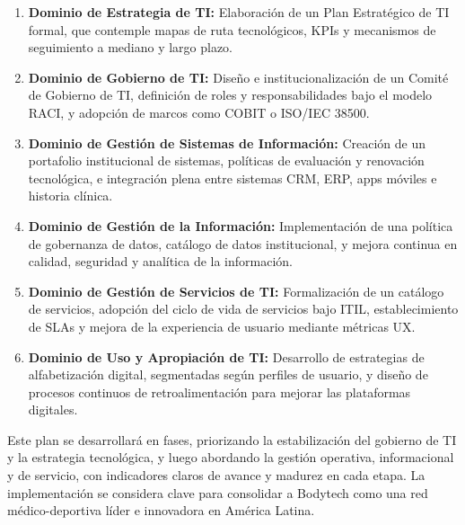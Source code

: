 \begin{enumerate}[label=\textbf{\arabic*.}]
    \item \textbf{Dominio de Estrategia de TI:} Elaboración de un Plan Estratégico de TI formal, que contemple mapas de ruta tecnológicos, KPIs y mecanismos de seguimiento a mediano y largo plazo.
    
    \item \textbf{Dominio de Gobierno de TI:} Diseño e institucionalización de un Comité de Gobierno de TI, definición de roles y responsabilidades bajo el modelo RACI, y adopción de marcos como COBIT o ISO/IEC 38500.
    
    \item \textbf{Dominio de Gestión de Sistemas de Información:} Creación de un portafolio institucional de sistemas, políticas de evaluación y renovación tecnológica, e integración plena entre sistemas CRM, ERP, apps móviles e historia clínica.
    
    \item \textbf{Dominio de Gestión de la Información:} Implementación de una política de gobernanza de datos, catálogo de datos institucional, y mejora continua en calidad, seguridad y analítica de la información.
    
    \item \textbf{Dominio de Gestión de Servicios de TI:} Formalización de un catálogo de servicios, adopción del ciclo de vida de servicios bajo ITIL, establecimiento de SLAs y mejora de la experiencia de usuario mediante métricas UX.
    
    \item \textbf{Dominio de Uso y Apropiación de TI:} Desarrollo de estrategias de alfabetización digital, segmentadas según perfiles de usuario, y diseño de procesos continuos de retroalimentación para mejorar las plataformas digitales.
\end{enumerate}

\bigskip

Este plan se desarrollará en fases, priorizando la estabilización del gobierno de TI y la estrategia tecnológica, y luego abordando la gestión operativa, informacional y de servicio, con indicadores claros de avance y madurez en cada etapa. La implementación se considera clave para consolidar a Bodytech como una red médico-deportiva líder e innovadora en América Latina.
